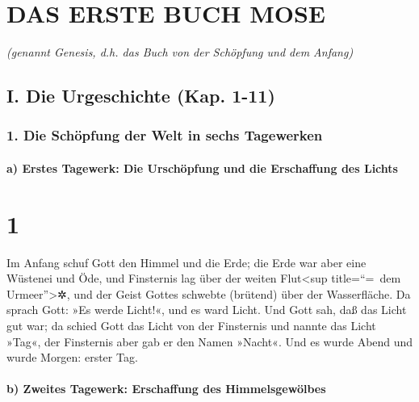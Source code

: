 \hypertarget{das-erste-buch-mose}{%
\section{DAS ERSTE BUCH MOSE}\label{das-erste-buch-mose}}

\emph{(genannt Genesis, d.h. das Buch von der Schöpfung und dem Anfang)}

\hypertarget{i.-die-urgeschichte-kap.-1-11}{%
\subsection{I. Die Urgeschichte (Kap.
1-11)}\label{i.-die-urgeschichte-kap.-1-11}}

\hypertarget{die-schuxf6pfung-der-welt-in-sechs-tagewerken}{%
\subsubsection{1. Die Schöpfung der Welt in sechs
Tagewerken}\label{die-schuxf6pfung-der-welt-in-sechs-tagewerken}}

\hypertarget{a-erstes-tagewerk-die-urschuxf6pfung-und-die-erschaffung-des-lichts}{%
\paragraph{a) Erstes Tagewerk: Die Urschöpfung und die Erschaffung des
Lichts}\label{a-erstes-tagewerk-die-urschuxf6pfung-und-die-erschaffung-des-lichts}}

\hypertarget{section}{%
\section{1}\label{section}}

 Im Anfang schuf Gott den Himmel und die Erde;
 die Erde war aber eine Wüstenei und Öde, und Finsternis
lag über der weiten Flut\textless sup title=``=~dem
Urmeer''\textgreater✲, und der Geist Gottes schwebte (brütend) über der
Wasserfläche.  Da sprach Gott: »Es werde Licht!«, und es
ward Licht.  Und Gott sah, daß das Licht gut war; da
schied Gott das Licht von der Finsternis  und nannte das
Licht »Tag«, der Finsternis aber gab er den Namen »Nacht«. Und es wurde
Abend und wurde Morgen: erster Tag.

\hypertarget{b-zweites-tagewerk-erschaffung-des-himmelsgewuxf6lbes}{%
\paragraph{b) Zweites Tagewerk: Erschaffung des
Himmelsgewölbes}\label{b-zweites-tagewerk-erschaffung-des-himmelsgewuxf6lbes}}

